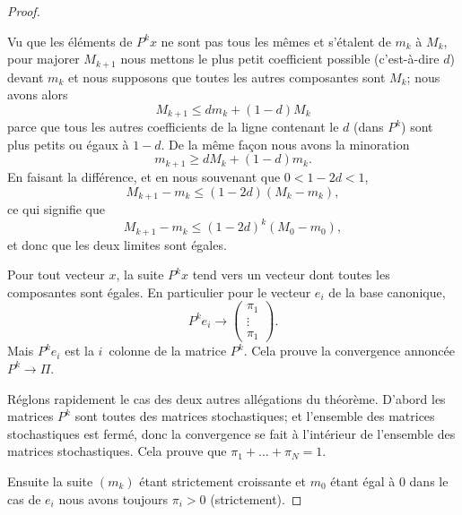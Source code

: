 \begin{proof}
\begin{subproof}
		Vu que les éléments de \( P^kx\) ne sont pas tous les mêmes et s'étalent de \( m_k\) à \( M_k\), pour majorer \( M_{k+1}\) nous mettons le plus petit coefficient possible (c'est-à-dire \( d\)) devant \( m_k\) et nous supposons que toutes les autres composantes sont \( M_k\); nous avons alors
		\begin{equation}
			M_{k+1}\leq dm_k+(1-d)M_k
		\end{equation}
		parce que tous les autres coefficients de la ligne contenant le \( d\) (dans \( P^k\)) sont plus petits ou égaux à \( 1-d\). De la même façon nous avons la minoration
		\begin{equation}
			m_{k+1}\geq dM_k+(1-d)m_k.
		\end{equation}
		En faisant la différence, et en nous souvenant que \( 0<1-2d<1\),
		\begin{equation}
			M_{k+1}-m_k\leq (1-2d)(M_k-m_k),
		\end{equation}
		ce qui signifie que
		\begin{equation}
			M_{k+1}-m_k\leq (1-2d)^k(M_0-m_0),
		\end{equation}
		et donc que les deux limites sont égales.


		Pour tout vecteur \( x\), la suite \( P^kx\) tend vers un vecteur dont toutes les composantes sont égales. En particulier pour le vecteur \( e_i\) de la base canonique,
		\begin{equation}
			P^ke_i\to\begin{pmatrix}
				\pi_1  \\
				\vdots \\
				\pi_1
			\end{pmatrix}.
		\end{equation}
		Mais \( P^ke_i\) est la \( i\)\ieme\ colonne de la matrice \( P^k\). Cela prouve la convergence annoncée \( P^k\to \Pi\).
	\end{subproof}

	Réglons rapidement le cas des deux autres allégations du théorème. D'abord les matrices \( P^k\) sont toutes des matrices stochastiques; et l'ensemble des matrices stochastiques est fermé, donc la convergence se fait à l'intérieur de l'ensemble des matrices stochastiques. Cela prouve que \( \pi_1+\ldots +\pi_N=1\).

	Ensuite la suite \( (m_k)\) étant strictement croissante et \( m_0\) étant égal à \( 0\) dans le cas de \( e_i\) nous avons toujours \( \pi_i>0\) (strictement).
\end{proof}

